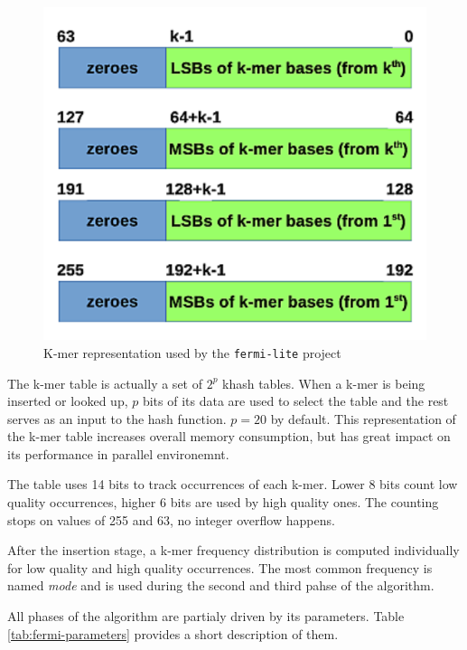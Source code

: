 \begin{figure}[h]
	\centering
	\includegraphics{img/fermi-kmer-structure.pdf}
	\caption{K-mer representation used by the \texttt{fermi-lite} project}
	\label{fig:fermi-kmer-structure}
\end{figure}

The k-mer table is actually a set of $2^p$ khash tables. When a k-mer is being inserted or looked up, $p$ bits of its data are used to select the table and the rest serves as an input to the hash function. $p = 20$ by default. This representation of the k-mer table increases overall memory consumption, but has great impact on its performance in parallel environemnt. 

The table uses 14 bits to track occurrences of each k-mer. Lower 8 bits count low quality occurrences, higher 6 bits are used by high quality ones. The counting stops on values of 255 and 63, no integer overflow happens.

After the insertion stage, a k-mer frequency distribution is computed individually for low quality and high quality occurrences. The most common frequency is named \textit{mode} and is used during the second and third pahse of the algorithm.

All phases of the algorithm are partialy driven by its parameters. Table \ref{tab:fermi-parameters} provides a short description of them.

